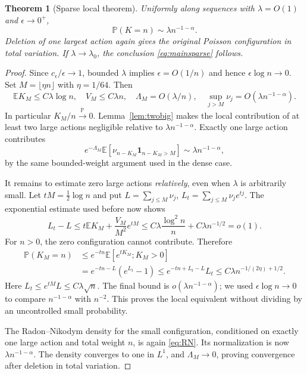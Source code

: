 \documentclass[11pt,a4paper]{article}
\numberwithin{equation}{section}
\newtheorem{theorem}{Theorem}[section]
\theoremstyle{definition}
\theoremstyle{remark}
\newcommand{\E}{\mathbb E}
\newcommand{\Prob}{\mathbb P}
\newcommand{\ee}{\epsilon}
\newcommand{\ind}{\mathbf1}
\newcommand{\pto}{\xrightarrow{\Prob}}
\begin{document}
\begin{theorem}[Sparse local theorem]\label{thm:sparse}
Uniformly along sequences with $\lambda=O(1)$ and $\ee\to0^+$,
\begin{equation}\label{eq:sparselocal}
 \Prob(K=n)\sim\lambda n^{-1-\alpha}.
\end{equation}
Deletion of one largest action again gives the original Poisson
configuration in total variation. If $\lambda\to\lambda_0$, the conclusion
\eqref{eq:mainsparse} follows.
\end{theorem}
\begin{proof}
Since $c_\ee/\ee\to1$, bounded $\lambda$ implies $\ee=O(1/n)$ and hence
$\ee\log n\to0$. Set $M=\lfloor\eta n\rfloor$ with $\eta=1/64$.
Then
\begin{equation}\label{eq:sparseestimates}
 \E K_M\le C\lambda\log n,\quad
 V_M\le C\lambda n,\quad
 \Lambda_M=O(\lambda/n),\quad
 \sup_{j>M}\nu_j=O(\lambda n^{-1-\alpha}).
\end{equation}
In particular $K_M/n\pto0$. Lemma~\ref{lem:twobig} makes the local
contribution of at least two large actions negligible relative to
$\lambda n^{-1-\alpha}$. Exactly one large action contributes
\[
 e^{-\Lambda_M}\E[\nu_{n-K_M}\ind_{n-K_M>M}]
 \sim\lambda n^{-1-\alpha},
\]
by the same bounded-weight argument used in the dense case.

It remains to estimate zero large actions \emph{relatively}, even when
$\lambda$ is arbitrarily small. Let $tM=\tfrac12\log n$ and put
$L=\sum_{j\le M}\nu_j$, $L_t=\sum_{j\le M}\nu_je^{tj}$.
The exponential estimate used before now shows
\[
 L_t-L
 \le t\E K_M+\frac{V_M}{M^2}e^{tM}
 \le C\lambda\frac{\log^2n}{n}+C\lambda n^{-1/2}=o(1).
\]
For $n>0$, the zero configuration cannot contribute. Therefore
\begin{align*}
 \Prob(K_M=n)
 &\le e^{-tn}\E[e^{tK_M};K_M>0]\\
 &=e^{-tn-L}(e^{L_t}-1)
 \le e^{-tn+L_t-L}L_t
 \le C\lambda n^{-1/(2\eta)+1/2}.
\end{align*}
Here $L_t\le e^{tM}L\le C\lambda\sqrt n$.
The final bound is $o(\lambda n^{-1-\alpha})$; we used
$\ee\log n\to0$ to compare $n^{-1-\alpha}$ with $n^{-2}$.
This proves the local equivalent without dividing by an uncontrolled
small probability.

The Radon--Nikodym density for the small configuration, conditioned on
exactly one large action and total weight $n$, is again
\eqref{eq:RN}. Its normalization is now $\lambda n^{-1-\alpha}$.
The density converges to one in $L^1$, and $\Lambda_M\to0$, proving
convergence after deletion in total variation.


\end{proof}
\end{document}
